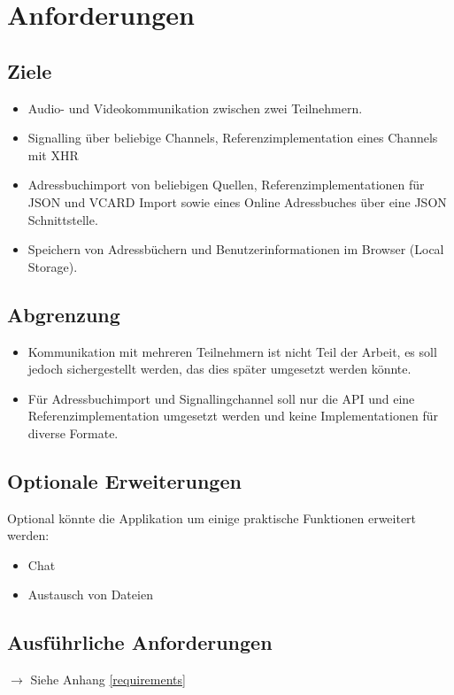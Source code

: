 \chapter{Anforderungen}
	\section{Ziele}
		\begin{itemize}
			\item Audio- und Videokommunikation zwischen zwei Teilnehmern.
			\item Signalling über beliebige Channels, Referenzimplementation eines Channels mit XHR
			\item Adressbuchimport von beliebigen Quellen, Referenzimplementationen für JSON und VCARD Import sowie eines Online Adressbuches über eine JSON Schnittstelle.
			\item Speichern von Adressbüchern und Benutzerinformationen im Browser (Local Storage).
		\end{itemize}

	
	\section{Abgrenzung}
		\begin{itemize}
			\item Kommunikation mit mehreren Teilnehmern ist nicht Teil der Arbeit, es soll jedoch sichergestellt werden, das dies später umgesetzt werden könnte.
			\item Für Adressbuchimport und Signallingchannel soll nur die API und eine Referenzimplementation umgesetzt werden und keine Implementationen für diverse Formate.
		\end{itemize}
		
	\section{Optionale Erweiterungen}
		Optional könnte die Applikation um einige praktische Funktionen erweitert werden:		
		\begin{itemize}
			\item Chat
			\item Austausch von Dateien
		\end{itemize}
		
	\section{Ausführliche Anforderungen}
		$\rightarrow$ Siehe Anhang \ref{requirements}
